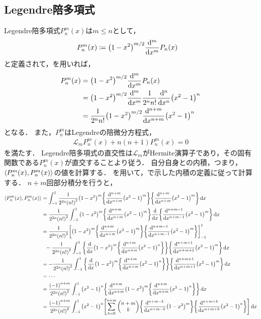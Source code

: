 \documentclass{report}
\begin{document}
  \subsection{Legendre陪多項式}
    Legendre陪多項式$P_n^m(x)$は$m \leq n$として，
    \begin{align}
      P_n^m(x) &\coloneqq \qty(1 - x^2)^{m/2}\dv[m]{x}P_n(x)
    \end{align}
    と定義されて，を用いれば，
    \begin{align}
      P_n^m(x) &= \qty(1 - x^2)^{m/2}\dv[m]{x}P_n(x) \\ 
      &= \qty(1 - x^2)^{m/2}\dv[m]{x}\frac{1}{2^nn!}\dv[n]{x}\qty(x^2 - 1)^n \\ 
      &= \frac{1}{2^nn!}\qty(1 - x^2)^{m/2}\dv[n + m]{x}\qty(x^2 - 1)^n \label{assos-legendre-polynominal}
    \end{align}
    となる．
    また，$P_n^m$はLegendreの陪微分方程式，
    \begin{align}
      \mathcal{L}_mP_n^m(x) + n(n + 1)P_n^m(x) = 0\label{assos-legendre-diff-eq}
    \end{align}
    を満たす．
    Legendre陪多項式の直交性は$\mathcal{L}_m$がHermite演算子であり，その固有関数である$P_n^m(x)$が直交することより従う．
    自分自身との内積，つまり，$\left\langle P_n^m(x), P_n^m(x) \right\rangle$の値を計算する．
    を用いて，で示した内積の定義に従って計算する．
    $n + m$回部分積分を行うと，
    \begin{align}
      \inner{P_{n}^m(x)}{P_{n}^m(x)} &= \int_{-1}^{1}\frac{1}{2^{2n}\qty(n!)^2}\qty(1 - x^2)^m \qty{\dv[n + m]{x}\qty(x^2 - 1)^m}\qty{\dv[n + m]{x}\qty(x^2 - 1)^m} \dd{x} \\ 
      &= \frac{1}{2^{2n}\qty(n!)^2}\int_{-1}^{1}\qty(1 - x^2)^m \qty{\dv[n + m]{x}\qty(x^2 - 1)^m}\dv{x}\qty{\dv[n + m - 1]{x}\qty(x^2 - 1)^m} \dd{x} \\ 
      &= \frac{1}{2^{2n}\qty(n!)^2}\qty[\qty(1 - x^2)^m\qty{\dv[n + m]{x}\qty(x^2 - 1)^m}\qty{\dv[n + m - 1]{x}\qty(x^2 - 1)^m}]_{-1}^{1} \\ 
      &\ \ -\frac{1}{2^{2n}\qty(n!)^2} \int_{-1}^{1}\qty{\dv{x}\qty(1 - x^2)^m\qty{\dv[n + m]{x}(x^2 - 1)^n}}\qty{\dv[n + m + 1]{x}\qty(x^2 - 1)^m}\dd{x} \\ 
      &= -\frac{1}{2^{2n}\qty(n!)^2}\int_{-1}^{1}\qty{\dv{x}\qty(1 - x^2)^m\qty{\dv[n + m]{x}(x^2 - 1)^n}}\qty{\dv[n + m + 1]{x}\qty(x^2 - 1)^m} \dd{x} \\
      &= \cdots \\ 
      &= \frac{\qty(-1)^{n + m}}{2^{2n}\qty(n!)^2}\int_{-1}^{1}\qty(x^2 - 1)^n\qty{\dv[n + m]{x}\qty(1 - x^2)^m\qty{\dv[n + m]{x}\qty(x^2 - 1)^n}} \dd{x} \\ 
      &= \frac{\qty(-1)^{n + m}}{2^{2n}\qty(n!)^2}\int_{-1}^{1}\qty(x^2 - 1)^n\qty[\sum_{k = 0}^{n + m}\mqty(n + m \\ k)\qty{\dv[n + m - k]{x}\qty(1 - x^2)^m}\qty{\dv[n + m + k]{x}\qty(x^2 - 1)^n}] \dd{x}\label{use-leibniz-formula}
    \end{align}
\end{document}
